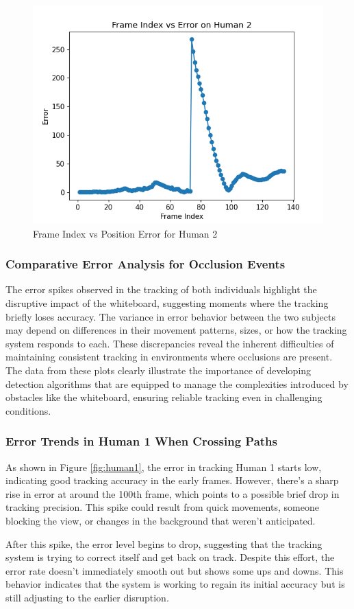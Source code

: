 \documentclass{article}
\begin{document}
\begin{figure}[H]
\centering
\includegraphics[width=0.5\linewidth]{plot_2.png}
\caption{Frame Index vs Position Error for Human 2}
\label{fig:human 2 behind board}
\end{figure}

\subsubsection{Comparative Error Analysis for Occlusion Events}

The error spikes observed in the tracking of both individuals highlight the disruptive impact of the whiteboard, suggesting moments where the tracking briefly loses accuracy. The variance in error behavior between the two subjects may depend on differences in their movement patterns, sizes, or how the tracking system responds to each. These discrepancies reveal the inherent difficulties of maintaining consistent tracking in environments where occlusions are present. The data from these plots clearly illustrate the importance of developing detection algorithms that are equipped to manage the complexities introduced by obstacles like the whiteboard, ensuring reliable tracking even in challenging conditions.

\subsubsection{Error Trends in Human 1 When Crossing Paths}

As shown in Figure \ref{fig:human1}, the error in tracking Human 1 starts low, indicating good tracking accuracy in the early frames. However, there's a sharp rise in error at around the 100th frame, which points to a possible brief drop in tracking precision. This spike could result from quick movements, someone blocking the view, or changes in the background that weren't anticipated.

After this spike, the error level begins to drop, suggesting that the tracking system is trying to correct itself and get back on track. Despite this effort, the error rate doesn't immediately smooth out but shows some ups and downs. This behavior indicates that the system is working to regain its initial accuracy but is still adjusting to the earlier disruption.
\end{document}
